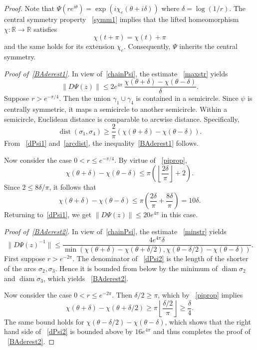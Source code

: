 \documentclass[11pt]{amsart}
\theoremstyle{remark}
\numberwithin{equation}{section}
\newcommand{\R}{\mathbb{R}}
\newcommand{\norm}[1]{\lVert#1\rVert}
\DeclareMathOperator{\dist}{dist}
\DeclareMathOperator{\diam}{diam}
\begin{document}
\begin{proof} Note that $\Psi(re^{i\theta}) = \exp(i \chi_e(\theta + i\delta))$ where $\delta = \log(1/r)$. The central symmetry property ~\eqref{symm1} implies that the lifted homeomorphism $\chi\colon\R\to\R$ satisfies 
\begin{equation}\label{piprop}
\chi(t+\pi) = \chi(t)+\pi
\end{equation}
and the same holds for its extension $\chi_e$. Consequently, $\Psi$ inherits the central symmetry.   

\textit{Proof of~\eqref{BAderest1}.} In view of~\eqref{chainPsi}, the estimate ~\eqref{maxstr} yields
\begin{equation}\label{dPsi1}
\norm{ D\Psi(z)}  \le 2e^{4\pi}\,  \frac{\chi(\theta+\delta)- \chi(\theta-\delta)}{\delta}.
\end{equation}
Suppose $r>e^{-\pi/4}$. Then the union $\gamma_1\cup \gamma_4$ is contained in a semicircle. Since $\psi$ is centrally symmetric, it maps a semicircle to another semicircle. Within a semicircle, Euclidean distance is comparable to arcwise distance. Specifically, 
\begin{equation}\label{arcdist}
\dist(\sigma_1, \sigma_4) \ge \frac{2}{\pi} (\chi(\theta+\delta)- \chi(\theta-\delta)). 
\end{equation}
From ~\eqref{dPsi1} and~\eqref{arcdist}, the inequality~\eqref{BAderest1} follows. 

Now consider the case $0<r\le e^{-\pi/4}$. By virtue of ~\eqref{piprop}, 
\[
\chi(\theta+\delta)- \chi(\theta-\delta) \le \pi\left(
\left \lfloor \frac{2\delta}{\pi}\right\rfloor+2\right). 
\]
Since $2\le 8\delta/\pi$, it follows that 
\[
\chi(\theta+\delta)- \chi(\theta-\delta) \le \pi\left(
 \frac{2\delta}{\pi}  + \frac{8\delta}{\pi} \right) = 10\delta.
\]
Returning to~\eqref{dPsi1}, we get  $\norm{ D\Psi(z)}  \le 20e^{4\pi}$ in this case.

\textit{Proof of~\eqref{BAderest2}.}
In view of~\eqref{chainPsi}, the estimate ~\eqref{minstr} yields
\begin{equation}\label{dPsi2}
\norm{D\Psi(z)^{-1}}   \le \frac{4 e^{4\pi} \delta }{\min(\chi(\theta+\delta)-\chi(\theta+\delta/2), \chi(\theta-\delta/2)-\chi(\theta-\delta))}.
\end{equation}
First suppose $r>e^{-2\pi}$. The denominator of ~\eqref{dPsi2} is the length of the shorter of the arcs $\sigma_2, \sigma_3$. Hence it is bounded from below by the minimum of $\diam \sigma_2$ and  $\diam\sigma_3$, which yields ~\eqref{BAderest2}.

Now consider the case $0<r\le e^{-2\pi}$. Then $\delta/2\ge \pi$, which by ~\eqref{piprop} implies
\[
\chi(\theta+\delta)-\chi(\theta+\delta/2) \ge \pi \left\lfloor \frac{\delta/2}{\pi}\right \rfloor 
\ge \frac{\delta}{4}.
\]
The same bound holds for $\chi(\theta-\delta/2)-\chi(\theta-\delta)$, which shows that the right hand side of ~\eqref{dPsi2} is bounded above by $16e^{4\pi}$ and thus completes the proof of ~\eqref{BAderest2}. 
\end{proof}
\end{document}
